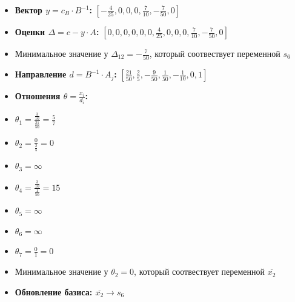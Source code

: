 \begin{itemize}
\begin{itemize}
\item \textbf{Вектор $y = c_B \cdot B^{-1}$:}
$[- \frac{4}{25}, 0, 0, 0, \frac{7}{10}, - \frac{7}{50}, 0]$
\item \textbf{Оценки $\Delta = c - y \cdot A$:}
$[0, 0, 0, 0, 0, 0, \frac{4}{25}, 0, 0, 0, \frac{7}{10}, - \frac{7}{50}, 0]$
\item Минимальное значение у  $\Delta_{12} = - \frac{7}{50}$, который соотвествует переменной $s_6$
\item \textbf{Направление $d = B^{-1} \cdot A_j$:}
$[\frac{21}{50}, \frac{2}{5}, - \frac{9}{50}, \frac{1}{50}, - \frac{1}{10}, 0, 1]$
\item \textbf{Отношения $\theta = \frac{x_i}{d_i}$:}
\item $\theta_{1} = \frac{\frac{3}{10}}{\frac{21}{50}} = \frac{5}{7}$
\item $\theta_{2} = \frac{0}{\frac{2}{5}} = 0$
\item $\theta_{3} = \infty$
\item $\theta_{4} = \frac{\frac{3}{10}}{\frac{1}{50}} = 15$
\item $\theta_{5} = \infty$
\item $\theta_{6} = \infty$
\item $\theta_{7} = \frac{0}{1} = 0$
\item Минимальное значение у  $\theta_{2} = 0$, который соотвествует переменной $\overline{x_2}$
\item \textbf{Обновление базиса: $\overline{x_2} \rightarrow s_6$}
\end{itemize}
\newpage

\end{itemize}
